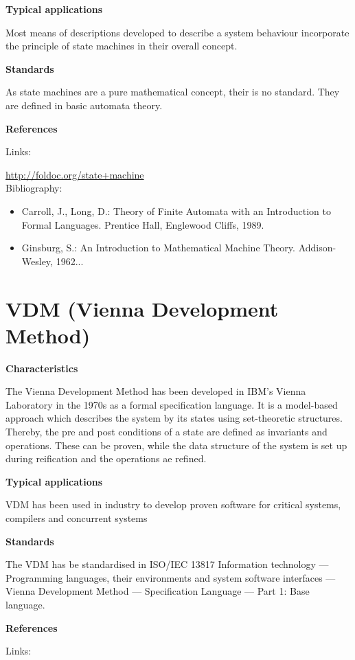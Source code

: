 \documentclass{./template/openetcs_report}
\begin{document}
	\textbf{Typical applications}

Most means of descriptions developed to describe a system behaviour incorporate the principle of state machines in their overall concept.

	\textbf{Standards}

As state machines are a pure mathematical concept, their is no standard. They are defined in basic automata theory.

	\textbf{References}

Links:

\url{http://foldoc.org/state+machine} \\[4pt]

Bibliography:
\begin{itemize}
\item Carroll, J., Long, D.: Theory of Finite Automata with an Introduction to Formal Languages. Prentice Hall, Englewood Cliffs, 1989.
\item Ginsburg, S.: An Introduction to Mathematical Machine Theory. Addison-Wesley, 1962...
\end{itemize}


\section{VDM (Vienna Development Method)}


	\textbf{Characteristics}

The Vienna Development Method has been developed in IBM's Vienna Laboratory in the 1970s as a formal specification language. It is a model-based approach which describes the system by its states using set-theoretic structures. Thereby, the pre and post conditions of a state are defined as invariants and operations. These can be proven, while the data structure of the system is set up during reification and the operations ae refined.
 
	\textbf{Typical applications}

VDM has been used in industry to develop proven software for critical systems, compilers and concurrent systems

	\textbf{Standards}
	
	The VDM has be standardised in ISO/IEC 13817 Information technology — Programming languages, their environments and system software interfaces — Vienna Development Method — Specification Language — Part 1: Base language.
	
	\textbf{References}

Links:
\end{document}
